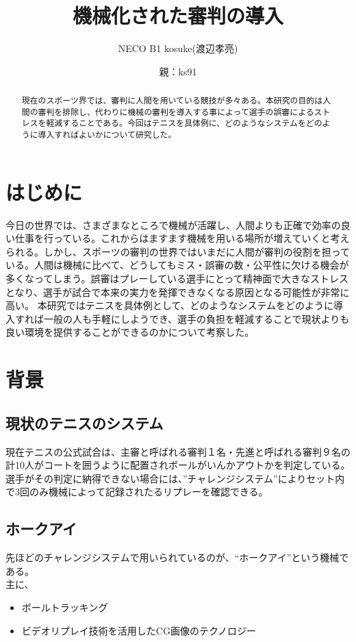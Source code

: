 \documentclass[a4j,10pt]{jsarticle}
\begin{document}

\title{機械化された審判の導入}

\author{
    NECO B1 kosuke(渡辺孝亮) 
    \and
    親：ks91 }

\begin{abstract}
現在のスポーツ界では、審判に人間を用いている競技が多々ある。本研究の目的は人間の審判を排除し、代わりに機械の審判を導入する事によって選手の誤審によるストレスを軽減することである。今回はテニスを具体例に、どのようなシステムをどのように導入すればよいかについて研究した。
\end{abstract}

\maketitle
\thispagestyle{empty}

\section{はじめに}

今日の世界では、さまざまなところで機械が活躍し、人間よりも正確で効率の良い仕事を行っている。これからはますます機械を用いる場所が増えていくと考えられる。しかし、スポーツの審判の世界ではいまだに人間が審判の役割を担っている。人間は機械に比べて、どうしてもミス・誤審の数・公平性に欠ける機会が多くなってしまう。誤審はプレーしている選手にとって精神面で大きなストレスとなり、選手が試合で本来の実力を発揮できなくなる原因となる可能性が非常に高い。
本研究ではテニスを具体例として、どのようなシステムをどのように導入すれば一般の人も手軽にしようでき、選手の負担を軽減することで現状よりも良い環境を提供することができるのかについて考察した。


\section{背景}

\subsection{現状のテニスのシステム}
現在テニスの公式試合は、主審と呼ばれる審判１名・先進と呼ばれる審判９名の計10人がコートを囲うように配置されボールがいんかアウトかを判定している。選手がその判定に納得できない場合には、”チャレンジシステム”によりセット内で3回のみ機械によって記録されたるリプレーを確認できる。



\subsection{ホークアイ}
先ほどのチャレンジシステムで用いられているのが、“ホークアイ”という機械である。
\\ 主に、
\begin{itemize}
\item ボールトラッキング
\item ビデオリプレイ技術を活用したCG画像のテクノロジー
\end{itemize}
\end{document}

